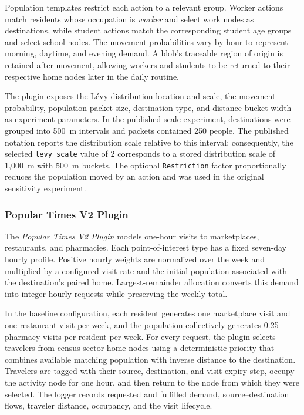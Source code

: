 Population templates restrict each action to a relevant group. Worker actions match residents whose occupation is \textit{worker} and select work nodes as destinations, while student actions match the corresponding student age groups and select school nodes. The movement probabilities vary by hour to represent morning, daytime, and evening demand. A blob's traceable region of origin is retained after movement, allowing workers and students to be returned to their respective home nodes later in the daily routine.

The plugin exposes the L\'evy distribution location and scale, the movement probability, population-packet size, destination type, and distance-bucket width as experiment parameters. In the published scale experiment, destinations were grouped into 500~m intervals and packets contained 250 people. The published notation reports the distribution scale relative to this interval; consequently, the selected \texttt{levy\_scale} value of 2 corresponds to a stored distribution scale of 1,000~m with 500~m buckets. The optional \texttt{Restriction} factor proportionally reduces the population moved by an action and was used in the original sensitivity experiment.

\subsubsection{Popular Times V2 Plugin}

The \textit{Popular Times V2 Plugin} models one-hour visits to marketplaces, restaurants, and pharmacies. Each point-of-interest type has a fixed seven-day hourly profile. Positive hourly weights are normalized over the week and multiplied by a configured visit rate and the initial population associated with the destination's paired home. Largest-remainder allocation converts this demand into integer hourly requests while preserving the weekly total.

In the baseline configuration, each resident generates one marketplace visit and one restaurant visit per week, and the population collectively generates 0.25 pharmacy visits per resident per week. For every request, the plugin selects travelers from census-sector home nodes using a deterministic priority that combines available matching population with inverse distance to the destination. Travelers are tagged with their source, destination, and visit-expiry step, occupy the activity node for one hour, and then return to the node from which they were selected. The logger records requested and fulfilled demand, source--destination flows, traveler distance, occupancy, and the visit lifecycle.


